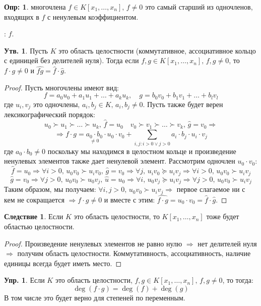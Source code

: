 \documentclass[12pt]{article}
\theoremstyle{definition}
\newtheorem{defn}{Опр:}
\newtheorem{prop}{Утв.}
\newtheorem{exrc}{Упр.}
\newtheorem{corollary}{Следствие}
\newcommand{\ddsum}[2]{\displaystyle\sum\limits_{#1}^{#2}}
\newcommand{\wht}[1]{\widehat{#1}}
\begin{document}
\begin{defn}
	 многочлена $f \in K[x_1,\dotsc,x_n], \, f \neq 0$ это самый старший из одночленов, входящих в $f$ с ненулевым коэффициентом. 
	
	\textbf{}: $\wht{f}$.
\end{defn}
\begin{prop}
	Пусть $K$ это область целостности (коммутативное, ассоциативное кольцо с единицей без делителей нуля). Тогда если $f,g \in K[x_1,\dotsc,x_n], \, f,g \neq 0$, то $f{\cdot}g \neq 0$ и $\wht{fg} = \wht{f}{\cdot}\wht{g}$.
\end{prop}
\begin{proof}
	Пусть многочлены имеют вид:
	$$
		f = a_0u_0 + a_1u_1 + \dotsc + a_ku_k, \quad g = b_0v_0 + b_1v_1 + \dotsc+ b_lv_l
	$$
	где $u_i, v_j$ это одночлены, $a_i, b_j \in K, \, a_i, b_j \neq 0$. Пусть также будет верен лексикографический порядок:
	$$
		u_0 \succ u_1 \succ \dotsc \succ u_k,\, \wht{f} = u_0 \quad v_0 \succ v_1 \succ \dotsc\succ v_k, \, \wht{g} = v_0 \Rightarrow
	$$
	$$
		\Rightarrow f{\cdot}g = \underset{\neq 0}{a_0{\cdot}b_0}{\cdot}u_0{\cdot}v_0 + \ddsum{i,j \colon i > 0 \vee j > 0 }{}a_i{\cdot}b_j{\cdot}u_i{\cdot}v_j
	$$
	где $a_0{\cdot}b_0 \neq 0$ поскольку мы находимся в целостном кольце и произведение ненулевых элементов также дает ненулевой элемент. Рассмотрим одночлен $u_0{\cdot}v_0$:
	$$
		\wht{f} = u_0 \Rightarrow \forall i > 0, \, u_0v_0 \succ u_iv_0, \, \wht{g} = v_0 \Rightarrow \forall j, \, u_iv_0 \succeq u_iv_j \Rightarrow \forall i > 0, \, u_0 v_0 \succ u_i v_j
	$$
	$$
		\wht{g} = v_0 \Rightarrow \forall j > 0, \, u_0v_0 \succ u_0v_j, \, \wht{u} = u_0 \Rightarrow \forall i, \, u_0v_j \succeq u_iv_j \Rightarrow \forall j > 0, \, u_0 v_0 \succ u_i v_j
	$$
	Таким образом, мы получаем: $\forall i,j > 0, \, u_0v_0 \succ u_iv_j \Rightarrow$ первое слагаемое ни с кем не сокращается $\Rightarrow f{\cdot}g \neq 0$ и вместе с этим: $\wht{f{\cdot}g} = u_0{\cdot}v_0 = \wht{f}{\cdot}\wht{g}$.
\end{proof}

\begin{corollary}
	Если $K$ это область целостности, то $K[x_1,\dotsc, x_n]$ тоже будет областью целостности.
\end{corollary}
\begin{proof}
	Произведение ненулевых элементов не равно нулю $\Rightarrow$ нет делителей нуля $\Rightarrow$ получим область целостности. Коммутативность, ассоциативность, наличие единицы всегда будет иметь место.
\end{proof}
\begin{exrc}
	Если $K$ это область целостности, $f,g \in K[x_1,\dotsc, x_n], \, f,g \neq 0$, то тогда: 
	$$
		\deg(f{\cdot}g) = \deg(f) + \deg(g)
	$$ 
	В том числе это будет верно для степеней по переменным.
\end{exrc}
\end{document}
